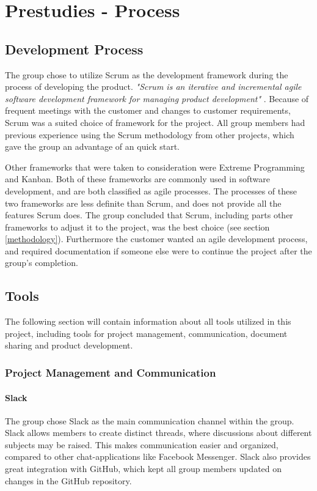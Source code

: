 
\chapter{Prestudies - Process}

\section{Development Process} \label{s:development_process}
The group chose to utilize Scrum \cite{scrum} as the development framework during the process of developing the product. \textit{"Scrum is an iterative and incremental agile software development framework for managing product development"} \cite{scrumWikipedia}. Because of frequent meetings with the customer and changes to customer requirements, Scrum was a suited choice of framework for the project. All group members had previous experience using the Scrum methodology from other projects, which gave the group an advantage of an quick start. 

Other frameworks that were taken to consideration were Extreme Programming and Kanban. Both of these frameworks are commonly used in software development, and are both classified as agile processes. The processes of these two frameworks are less definite than Scrum, and does not provide all the features Scrum does. The group concluded that Scrum, including parts other frameworks to adjust it to the project, was the best choice (see section \ref{methodology}). Furthermore the customer wanted an agile development process, and required documentation if someone else were to continue the project after the group's completion. 

\section{Tools}
\label{tools}
The following section will contain information about all tools utilized in this project, including tools for project management, communication, document sharing and product development.

\subsection{Project Management and Communication}

\subsubsection{Slack}
The group chose Slack \cite{Slack} as the main communication channel within the group. Slack allows members to create distinct threads, where discussions about different subjects may be raised. This makes communication easier and organized, compared to other chat-applications like Facebook Messenger. Slack also provides great integration with GitHub, which kept all group members updated on changes in the GitHub repository. 

